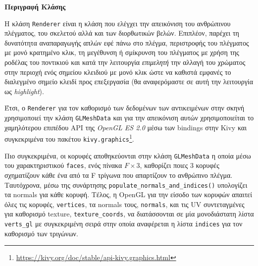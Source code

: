 \noindent\textbf{Περιγραφή Κλάσης}

Η κλάση \texttt{Renderer} είναι η κλάση που ελέγχει την απεικόνιση του ανθρώπινου πλέγματος, του σκελετού αλλά και των διορθωτικών βελών. Επιπλέον, παρέχει τη δυνατότητα αναπαραγωγής απλών εφέ πάνω στο πλέγμα, περιστροφής του πλέγματος με μονό κρατημένο κλικ, τη μεγέθυνση ή σμίκρυνση του πλέγματος με χρήση της ροδέλας του ποντικιού και κατά την λειτουργία \textsl{επιμελητή} την αλλαγή του χρώματος στην περιοχή ενός σημείου κλειδιού με μονό κλικ ώστε να καθιστά εμφανές το διαλεγμένο σημείο κλειδί προς επεξεργασία (θα αναφερόμαστε σε αυτή την λειτουργία ως \textsl{highlight}).

Έτσι, ο \texttt{Renderer} για τον καθορισμό των δεδομένων των αντικειμένων στην σκηνή χρησιμοποιεί την κλάση \texttt{GLMeshData} και για την απεικόνιση αυτών χρησιμοποιείται το χαμηλότερου επιπέδου API της \textsl{OpenGL ES 2.0} μέσω των bindings στην Kivy και συγκεκριμένα του πακέτου \texttt{kivy.graphics}\footnote{\href{https://kivy.org/doc/stable/api-kivy.graphics.html}{https://kivy.org/doc/stable/api-kivy.graphics.html}}.

Πιο συγκεκριμένα, οι κορυφές αποθηκεύονται στην κλάση \texttt{GLMeshData} η οποία μέσω του χαρακτηριστικού \texttt{faces}, ενός πίνακα $F \times 3$, καθορίζει ποιες 3 κορυφές σχηματίζουν κάθε ένα από τα F τρίγωνα που απαρτίζουν το ανθρώπινο πλέγμα. Ταυτόχρονα, μέσω της συνάρτησης \texttt{populate\_normals\_and\_indices()} υπολογίζει τα normals για κάθε κορυφή. Τέλος, η OpenGL για την είσοδο των κορυφών απαιτεί όλες τις κορυφές, \texttt{vertices}, τα normals τους, \texttt{normals}, και τις UV συντεταγμένες για καθορισμό texture, \texttt{texture\_coords}, να διατάσσονται σε μία μονοδιάστατη λίστα \texttt{verts\_gl} με συγκεκριμένη σειρά στην οποία αναφέρεται η λίστα \texttt{indices} για τον καθορισμό των τριγώνων.


